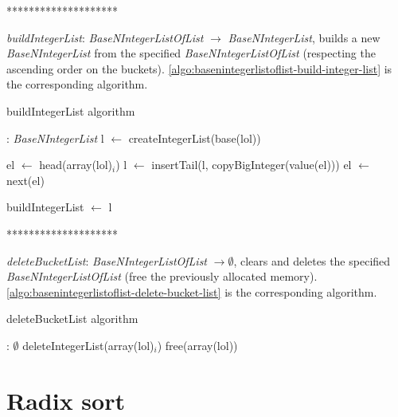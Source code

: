 \documentclass[book, nodocumentinfo]{upmethodology-document}
\newcommand{\separator}{\centerline{********************}}
\begin{document}
\separator

\emph{buildIntegerList}: \emph{BaseNIntegerListOfList} \(\rightarrow\) \emph{BaseNIntegerList},
builds a new \emph{BaseNIntegerList} from the specified \emph{BaseNIntegerListOfList}
(respecting the ascending order on the buckets).
\ref{algo:basenintegerlistoflist-build-integer-list} is the corresponding algorithm.

\begin{algorithm}[H]
    \caption{buildIntegerList algorithm}
    \label{algo:basenintegerlistoflist-build-integer-list}

    \begin{algorithmic}
         : \emph{BaseNIntegerList}
            \State l \(\leftarrow\) createIntegerList(base(lol))

                \State el \(\leftarrow\) head(array(lol)\(_i\))
                \State l \(\leftarrow\) insertTail(l, copyBigInteger(value(el)))
                    \State el \(\leftarrow\) next(el)
                \EndWhile
            \EndFor

            \State buildIntegerList \(\leftarrow\) l
        \EndFunction
    \end{algorithmic}
\end{algorithm}

\separator

\emph{deleteBucketList}: \emph{BaseNIntegerListOfList} \(\rightarrow \emptyset\),
clears and deletes the specified \emph{BaseNIntegerListOfList} (free the previously allocated
memory).
\ref{algo:basenintegerlistoflist-delete-bucket-list} is the corresponding algorithm.

\begin{algorithm}[H]
    \caption{deleteBucketList algorithm}
    \label{algo:basenintegerlistoflist-delete-bucket-list}

    \begin{algorithmic}
         : \(\emptyset\)
                \State deleteIntegerList(array(lol)\(_i\))
            \EndFor
            \State free(array(lol))
        \EndFunction
    \end{algorithmic}
\end{algorithm}

\section{Radix sort}
\end{document}
